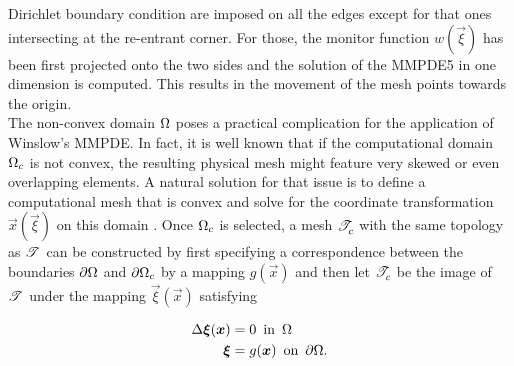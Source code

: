 \documentclass[a4paper,11pt]{article}
\begin{document}
{Dirichlet boundary condition are imposed on all the edges except for that ones intersecting at the re-entrant corner. For those, the monitor function $w(\vec{\xi})$ has been first projected onto the two sides and the solution of the MMPDE5 \cite{HR:2011} in one dimension is computed. This results in the movement of the mesh points towards the origin.\\


The non-convex domain $\Omega$ poses a practical complication for the application of Winslow's MMPDE. In fact, it is well known that if the computational domain $\Omega_{c}$ is not convex, the resulting physical mesh might feature very skewed or even overlapping elements. A natural solution for that issue is to define a computational mesh that is convex and solve for the coordinate transformation $\vec{x}(\vec{\xi})$ on this domain \cite{CHR:1999,LTZ:2001}. Once $\Omega_c$ is selected, a mesh $\mathscr T^{}_{c}$ with the same topology as $\mathscr T^{}$ can be constructed by first specifying a correspondence between the boundaries $\partial \Omega$ and $\partial \Omega_{c}$ by a mapping $g(\vec{x})$ and then let  $\mathscr T^{}_{c}$ be the image of $\mathscr T^{}$ under the mapping $\vec{\xi}(\vec{x})$ satisfying


\begin{equation}
\label{eq:map_domain}
\begin{split}
    \Delta \boldsymbol \xi(\boldsymbol x) &= 0 \, \text{ in } \, \Omega \\
    \boldsymbol \xi &= g(\boldsymbol x) \, \text{ on } \, \partial \Omega.
\end{split}
\end{equation}

}
\end{document}
